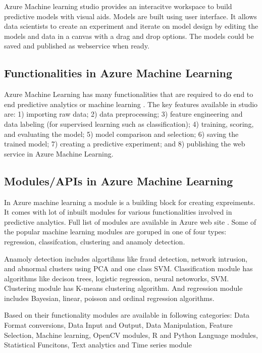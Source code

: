 \documentclass[9pt,twocolumn,twoside]{../../styles/osajnl}
\begin{document}
Azure Machine learning studio provides an interacitve workspace to
build predictive models with visual aids. Models are built using user
interface. It allows data scientists to create an experiment and
iterate on model design by editing the models and data in a canvas
with a drag and drop options.  The models could be saved and published
as webservice when ready. 

\subsection{Functionalities in Azure Machine Learning}

Azure Machine Learning has many functionalities that are required to
do end to end predictive analytics or machine
learning \cite{www-azureMLStudioCapabilities}. The key features
available in studio are: 1) importing raw data; 2) data preprocessing;
3) feature engineering and data labeling (for supervised learning such
as classification); 4) training, scoring, and evaluating the model; 5)
model comparison and selection; 6) saving the trained model; 7)
creating a predictive experiment; and 8) publishing the web service in
Azure Machine Learning.

\subsection{Modules/APIs in Azure Machine Learning}
In Azure machine learning a module is a building block for creating
expreiments. It comes with lot of inbuilt modules for various
functionalities involved in predictive analytics. Full list of modules
are available in Azure web site \cite{www-azureMLModules}. Some of the
popular machine learning modules are goruped in one of four types:
regression, classifcation, clustering and anamoly detection.

Anamoly detection includes algortihms like fraud detection, network
intrusion, and abnormal clusters using PCA and one class
SVM. Classification module has algorithms like decison trees, logistic
regression, neural netoworks, SVM. Clustering module has K-means
clustering algorithm. And regression module includes Bayesian, linear,
poisson and ordinal regression algorithms.

Based on their functionality modules are available in following
categories: Data Format conversions, Data Input and Output, Data
Manipulation, Feature Selection, Machine learning, OpenCV modules, R
and Python Language modules, Statistical Funcitons, Text analytics and
Time series module \cite{www-azureMLModuleCategories}
\end{document}
